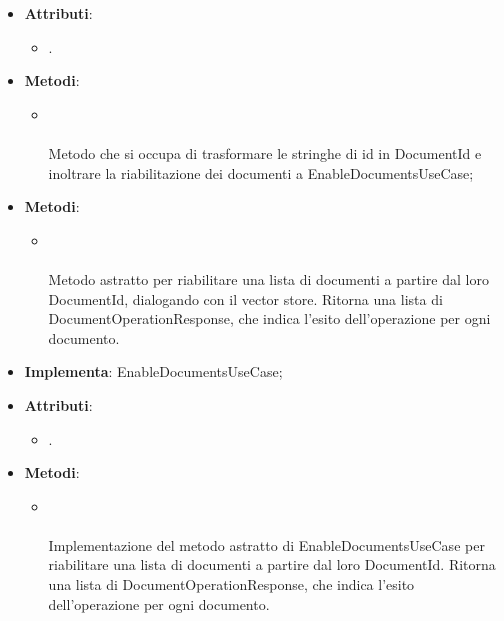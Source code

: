 \documentclass[10pt, a4paper]{article}
\begin{document}
\label{EnableDocumentsControllerDettaglio}
\begin{itemize}
    \item \textbf{Attributi}:
    \begin{itemize}
        \item {}.
    \end{itemize}
    \item \textbf{Metodi}:
    \begin{itemize}
        \item {}\\ \\
        Metodo che si occupa di trasformare le stringhe di id in DocumentId e inoltrare la riabilitazione dei documenti a EnableDocumentsUseCase;
    \end{itemize}
\end{itemize}


\label{EnableDocumentsPortDettaglio}
\begin{itemize}
    \item \textbf{Metodi}:
    \begin{itemize}
        \item {}\\ \\
        Metodo astratto per riabilitare una lista di documenti a partire dal loro DocumentId, dialogando con il vector store. Ritorna una lista di DocumentOperationResponse, che indica l'esito dell'operazione per ogni documento.
    \end{itemize}
\end{itemize}

\label{EnableDocumentsServiceDettaglio}
\begin{itemize}
    \item \textbf{Implementa}: EnableDocumentsUseCase;
    \item \textbf{Attributi}:
    \begin{itemize}
        \item {}.  
    \end{itemize}
    \item \textbf{Metodi}:
    \begin{itemize}
        \item {}\\ \\
        Implementazione del metodo astratto di EnableDocumentsUseCase per riabilitare una lista di documenti a partire dal loro DocumentId. Ritorna una lista di DocumentOperationResponse, che indica l'esito dell'operazione per ogni documento.
    \end{itemize}
\end{itemize}
\end{document}
